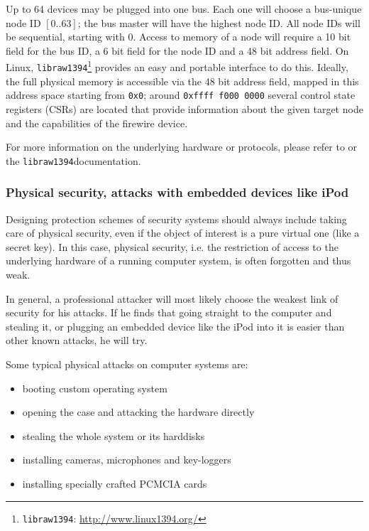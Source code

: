 Up to 64 devices may be plugged into one bus. Each one will choose a bus-unique
node ID $[0..63]$; the bus master will have the highest node ID. All node IDs
will be sequential, starting with 0. Access to memory of a node will require a
10 bit field for the bus ID, a 6 bit field for the node ID and a 48 bit address
field.  On Linux, \texttt{libraw1394}\footnote{\texttt{libraw1394}:
\href{http://www.linux1394.org/}{http://www.linux1394.org/}} provides an easy
and portable interface to do this. Ideally, the full physical memory is
accessible via the 48 bit address field, mapped in this address space starting
from \texttt{0x0}; around \texttt{0xffff~f000~0000} several control state
registers (CSRs) are located that provide information about the given target
node and the capabilities of the firewire device.

For more information on the underlying hardware or protocols, please refer to
\cite{OHCIspecs:2000,fwire_sys_arch:2222} or the
\texttt{libraw1394}\footnotemark[\value{footnote}] documentation.



\subsubsection{Physical security, attacks with embedded devices like iPod}

Designing protection schemes of security systems should always include taking
care of physical security, even if the object of interest is a pure virtual one
(like a secret key). In this case, physical security, i.e. the restriction of
access to the underlying hardware of a running computer system, is often
forgotten and thus weak.

In general, a professional attacker will most likely choose the weakest link of
security for his attacks. If he finds that going straight to the computer and
stealing it, or plugging an embedded device like the iPod into it is easier than
other known attacks, he will try.

Some typical physical attacks on computer systems are:

\begin{itemize}

	\item booting custom operating system

	\item opening the case and attacking the hardware directly

	\item stealing the whole system or its harddisks

	\item installing cameras, microphones and key-loggers

	\item installing specially crafted PCMCIA cards

\end{itemize}

